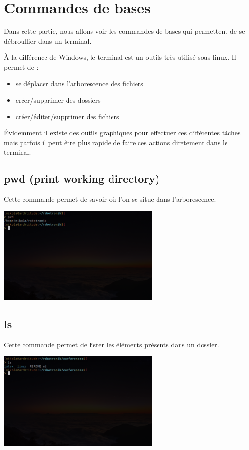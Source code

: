 \chapter{Commandes de bases}

Dans cette partie, nous allons voir les commandes de bases qui permettent de se débroullier dans un terminal.


À la différence de Windows, le terminal est un outils très utilisé sous linux. Il permet de :
\begin{itemize}
	\item se déplacer dans l'arborescence des fichiers
	\item créer/supprimer des dossiers
	\item créer/éditer/supprimer des fichiers
\end{itemize}

Évidemment il existe des outils graphiques pour effectuer ces différentes tâches mais parfois il peut être plus rapide de faire ces actions diretement dans le terminal.

\section{pwd (print working directory)}
Cette commande permet de savoir où l'on se situe dans l'arborescence.

\begin{center}
	\includegraphics[width=0.6\textwidth]{Images/pwd.png}
\end{center}

\section{ls}
Cette commande permet de lister les éléments présents dans un dossier.

\begin{center}
	\includegraphics[width=0.6\textwidth]{Images/ls.png}
\end{center}


